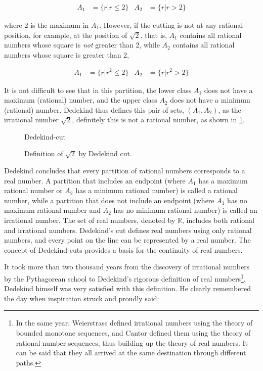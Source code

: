 \documentclass[b5paper]{article}
\begin{document}
\begin{align*}
A_1 &= \{r | r \leq 2\}  & A_2 &= \{r | r > 2\}
\end{align*}

where 2 is the maximum in $A_1$. However, if the cutting is not at any rational position, for example, at the position of $\sqrt{2}$, that is, $A_1$ contains all rational numbers whose square is \emph{not} greater than 2, while $A_2$ contains all rational numbers whose square is greater than 2,

\begin{align*}
A_1 &= \{r | r^2 \leq 2\}  & A_2 &= \{r | r^2 > 2\}
\end{align*}

It is not difficult to see that in this partition, the lower class $A_1$ does not have a maximum (rational) number, and the upper class $A_2$ does not have a minimum (rational) number. Dedekind thus defines this pair of sets, $(A_1, A_2)$, as the irrational number $\sqrt{2}$, definitely this is not a rational number, as shown in \cref{fig:Dedekind-cut}.

\begin{figure}[htbp]
 \centering
 {Dedekind-cut}
 \caption{Definition of $\sqrt{2}$ by Dedekind cut.}
 \label{fig:Dedekind-cut}
\end{figure}

\label{sec:Dedekind-cut}
Dedekind concludes that every partition of rational numbers corresponds to a real number. A partition that includes an endpoint (where $A_1$ has a maximum rational number or $A_2$ has a minimum rational number) is called a rational number, while a partition that does not include an endpoint (where $A_1$ has no maximum rational number and $A_2$ has no minimum rational number) is called an irrational number. The set of real numbers, denoted by $\mathbb{R}$, includes both rational and irrational numbers. Dedekind's cut defines real numbers using only rational numbers, and every point on the line can be represented by a real number. The concept of Dedekind cuts provides a basis for the continuity of real numbers.

It took more than two thousand years from the discovery of irrational numbers by the Pythagorean school to Dedekind's rigorous definition of real numbers\footnote{In the same year, Weierstrass defined irrational numbers using the theory of bounded monotone sequences, and Cantor defined them using the theory of rational number sequences, thus building up the theory of real numbers. It can be said that they all arrived at the same destination through different paths.}. Dedekind himself was very satisfied with this definition. He clearly remembered the day when inspiration struck and proudly said:
\end{document}
